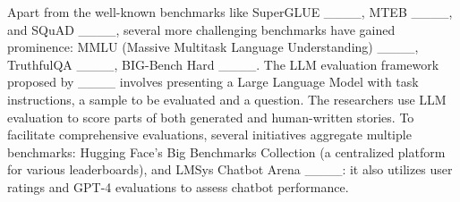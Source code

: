 Apart from the well-known benchmarks like SuperGLUE ____, MTEB ____, and SQuAD ____, several more challenging benchmarks have gained prominence: MMLU (Massive Multitask Language Understanding) ____,  TruthfulQA ____, BIG-Bench Hard ____. The LLM evaluation framework proposed by ____ involves presenting a Large Language Model with task instructions, a sample to be evaluated and a question. The researchers use LLM evaluation to score parts of both generated and human-written stories. %
To facilitate comprehensive evaluations, several initiatives aggregate multiple benchmarks:
Hugging Face's Big Benchmarks Collection (a centralized platform for various leaderboards), and 
LMSys Chatbot Arena ____: it also utilizes user ratings and GPT-4 evaluations to assess chatbot performance.